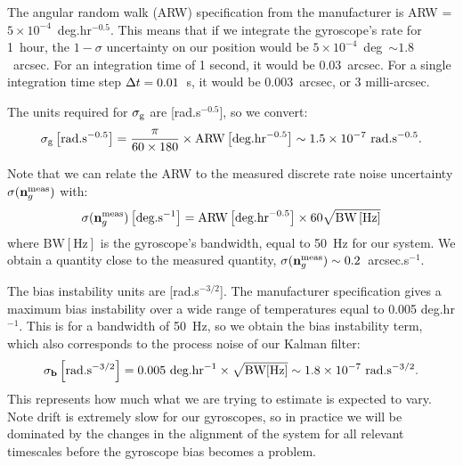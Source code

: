 
The angular random walk (ARW) specification from the manufacturer is ARW = $5\times 10^{-4}$~deg.hr$^{-0.5}$. This means that if we integrate the gyroscope's rate for 1~hour, the $1-\sigma$ uncertainty on our position would be 
$5\times 10^{-4}$~deg~$\sim 1.8$~arcsec. For an integration time of 1 second, it would be 0.03~arcsec. For a single integration time step $\Delta t = 0.01$~s, it would be 0.003~arcsec, or 3 milli-arcsec. 

The units required for $\sigma_{\textrm{g}}$ are [rad.s$^{-0.5}$], so we convert:
\begin{equation}
\sigma_{\textrm{g}}\left[\textrm{rad}.\textrm{s}^{-0.5}\right] = \frac{\pi}{60\times180}\times \textrm{ARW}\left[\textrm{deg}.\textrm{hr}^{-0.5}\right] \sim 1.5\times 10^{-7}~\textrm{rad}.\textrm{s}^{-0.5}.
\end{equation}

Note that we can relate the ARW to the measured discrete rate noise uncertainty $\sigma(\textbf{n}_g^\textrm{meas})$ with:
\begin{equation}
\sigma(\textbf{n}_g^\textrm{meas})\left[\textrm{deg}.\textrm{s}^{-1}\right] = \textrm{ARW}\left[\textrm{deg}.\textrm{hr}^{-0.5}\right]\times 60\sqrt{\textrm{BW}\left[\textrm{Hz}\right]}
\end{equation}
where $\textrm{BW}\left[\textrm{Hz}\right]$ is the gyroscope's bandwidth, equal to 50~Hz for our system. We obtain a quantity close to the measured quantity, $\sigma(\textbf{n}_g^\textrm{meas})\sim 0.2$~arcsec.s$^{-1}$.

The bias instability units are [rad.s$^{-3/2}$]. The manufacturer specification gives a maximum bias instability over a wide range of temperatures equal to 0.005 deg.hr$^{-1}$. This is for a bandwidth of 50~Hz, so we obtain the bias instability term, which also corresponds to the process noise of our Kalman filter:
\begin{equation}
\sigma_{\textrm{\textbf{b}}}\left[\textrm{rad}.\textrm{s}^{-3/2}\right] = 0.005~\textrm{deg.hr}^{-1}\times \sqrt{\textrm{BW}[\textrm{Hz}]}  \sim 1.8\times 10^{-7}~\textrm{rad}.\textrm{s}^{-3/2}.
\end{equation}
This represents how much what we are trying to estimate is expected to vary. Note drift is extremely slow for our gyroscopes, so in practice we will be dominated by the changes in the alignment of the system for all relevant timescales before the gyroscope bias becomes a problem.

